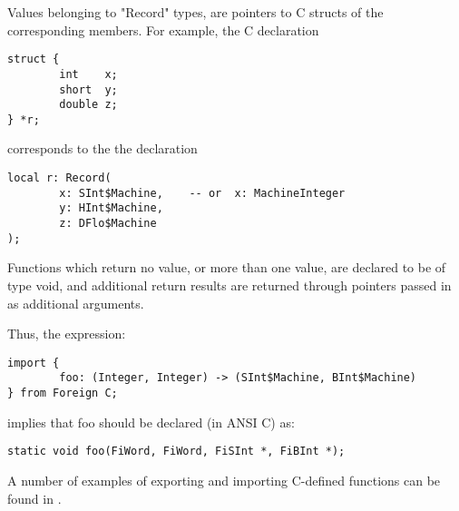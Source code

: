 Values belonging to \ttin"Record" types, are pointers to C structs of
the corresponding members.  For example, the C declaration

\begin{small}%
\begin{verbatim}
struct {
        int    x;
        short  y;
        double z;
} *r;
\end{verbatim}
\end{small}
%
corresponds to the the \asharp{} declaration
%
\begin{small}%
\begin{verbatim}
local r: Record(
        x: SInt$Machine,    -- or  x: MachineInteger
        y: HInt$Machine, 
        z: DFlo$Machine
);
\end{verbatim}
\end{small}

Functions which return no value, or more than one value,  are
declared to be of type void, and additional return results are
returned through pointers passed in as additional arguments.

Thus, the expression:
\begin{small}%
\begin{verbatim}
import {
        foo: (Integer, Integer) -> (SInt$Machine, BInt$Machine)
} from Foreign C;
\end{verbatim}
\end{small}
implies that foo should be declared (in ANSI C) as:
{\small
\begin{verbatim}
static void foo(FiWord, FiWord, FiSInt *, FiBInt *);
\end{verbatim}
}


A number of examples of exporting and importing C-defined functions
can be found in .


%
%

